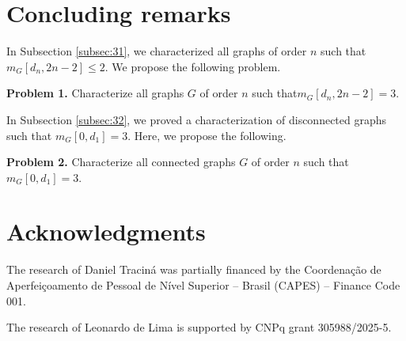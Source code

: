 \documentclass[preprint,12pt]{elsarticle}
\begin{document}
\section{Concluding remarks}

In Subsection \ref{subsec:31}, we characterized all graphs of order $n$ such that\linebreak \( m_G [d_{n}, 2n-2] \le 2 \). We propose the following problem.

\vspace{0.4cm}

\noindent \textbf{Problem 1.} Characterize all graphs $G$ of order $n$ such that\linebreak \( m_G [d_{n}, 2n-2] = 3 \).

\vspace{0.4cm}

In Subsection \ref{subsec:32}, we proved a characterization of disconnected graphs such that \( m_G [0, d_{1}] = 3 \). Here, we propose the following.

\vspace{0.4cm}

\noindent \textbf{Problem 2.} Characterize all connected graphs $G$ of order $n$ such that \( m_G [0, d_{1}] = 3 \).


\section*{Acknowledgments}
The research of Daniel Traciná was partially financed by the Coordenação de Aperfeiçoamento de Pessoal de Nível Superior – Brasil (CAPES) – Finance Code 001.

The research of Leonardo de Lima is supported by CNPq grant 305988/2025-5.\\


\end{document}

